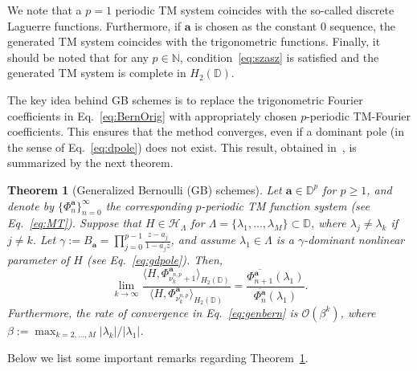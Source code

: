 \documentclass{arxiv}
\newtheorem{theorem}{Theorem}[section]
\begin{document}
We note that a $p=1$ periodic TM system coincides with the so-called discrete Laguerre functions. Furthermore, if $\boldsymbol{a}$ is chosen as the constant $0$ sequence, the generated TM system coincides with the trigonometric functions. Finally, it should be noted that for any $p \in \mathbb{N}$, condition~\eqref{eq:szasz} is satisfied and the generated TM system is complete in $H_2(\mathbb{D})$. 

The key idea behind GB schemes is to replace the trigonometric Fourier coefficients in Eq.~\eqref{eq:BernOrig} with appropriately chosen $p$-periodic TM-Fourier coefficients. This ensures that the method converges, even if a dominant pole (in the sense of Eq.~\eqref{eq:dpole}) does not exist. This result, obtained in~\cite{siamdozsa}, is summarized by the next theorem.

\begin{theorem}[Generalized Bernoulli (GB) schemes]
\label{thm:gbern}
    Let $\boldsymbol{a} \in \mathbb{D}^p$ for $p \geq 1$, and denote by $\{ \Phi_n^{\boldsymbol{a}} \}_{n=0}^{\infty}$ the corresponding $p$-periodic TM function system (see Eq.~\eqref{eq:MT}). Suppose that $H \in \mathcal{H}_{\Lambda}$ for $\Lambda = \{\lambda_1, \ldots, \lambda_M \} \subset \mathbb{D}$, where $\lambda_j \neq \lambda_k$ if $j \neq k$. Let $\gamma := B_{\boldsymbol{a}} = \prod_{j=0}^{p-1} \frac{z - a_j}{1 - \overline{a_j} z}$, and assume $\lambda_1 \in \Lambda$ is a $\gamma$-dominant nonlinear parameter of $H$ (see Eq.~\eqref{eq:gdpole}). Then,
    \begin{equation}
        \label{eq:genbern}
        \lim_{k \to \infty} \frac{\langle H, \Phi_{\nu_k^{n, p}+1}^{\boldsymbol{a}} \rangle_{H_2(\mathbb{D})}}{\langle H, \Phi_{\nu_k^{n, p}}^{\boldsymbol{a}} \rangle_{H_2(\mathbb{D})}} = \frac{\overline{\Phi_{n+1}^{\boldsymbol{a}}}(\lambda_1)}{\overline{\Phi_{n}^{\boldsymbol{a}}}(\lambda_1)}.
    \end{equation}
    Furthermore, the rate of convergence in Eq.~\eqref{eq:genbern} is $\mathcal{O}(\beta^k)$, where $\beta := \max_{k=2,\ldots,M} |\lambda_k| / |\lambda_1|$.
\end{theorem}

Below we list some important remarks regarding Theorem~\ref{thm:gbern}. 
\end{document}

